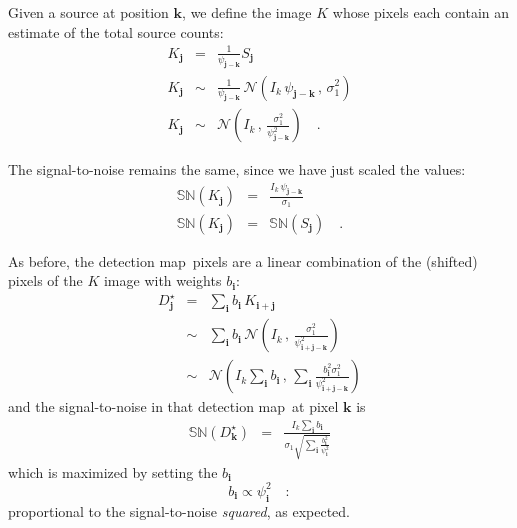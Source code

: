 \documentclass[letterpaper,preprint]{aastex62}
\newcommand{\detmap}{detection map}
\newcommand{\drawnfrom}{\sim}
\newcommand{\gaussianN}{\mathcal{N}}
\newcommand{\gaussian}[1]{\gaussianN\!\left(#1\right)}
\newcommand{\psf}{\psi}
\newcommand{\psfat}[1]{\psf_{#1}}
\newcommand{\snr}[1]{\mathbb{SN}(#1)}
\renewcommand{\vec}[1]{\boldsymbol{#1}}
\newcommand{\ivec}{\vec{i}}
\newcommand{\jvec}{\vec{j}}
\newcommand{\kvec}{\vec{k}}
\begin{document}
Given a source at position $\kvec$, we define the image $K$ whose
pixels each contain an estimate of the total source counts:
\begin{eqnarray}
  K_{\jvec} &=& \frac{1}{\psfat{\jvec-\kvec}} S_{\jvec}  \\
  K_{\jvec} &\drawnfrom& \frac{1}{\psfat{\jvec-\kvec}} \, \gaussian{I_k \, \psfat{\jvec-\kvec}\, , \, \sigma_1^2} \\
  K_{\jvec} &\drawnfrom& \gaussian{I_k \, , \, \frac{\sigma_1^2}{\psfat{\jvec-\kvec}^2}} \quad .
\end{eqnarray}

The signal-to-noise remains the same, since we have just scaled the
values:
\begin{eqnarray}
\snr{K_{\jvec}} &=& \frac{I_k \, \psfat{\jvec-\kvec}}{\sigma_1} \\
\snr{K_{\jvec}} &=& \snr{S_{\jvec}} \quad .
\end{eqnarray}


As before, the \detmap\ pixels are a linear combination of the
(shifted) pixels of the $K$ image with weights $b_{\ivec}$:
\begin{eqnarray}
D_{\jvec}^\star &=& \sum_{\ivec} b_{\ivec} \, K_{\ivec+\jvec} \\
&\drawnfrom& \sum_{\ivec} b_{\ivec} \, \gaussian{I_k \,,\, \frac{\sigma_1^2}{\psfat{\ivec+\jvec-\kvec}^2}} \\
&\drawnfrom& \gaussian{I_k \sum_{\ivec} b_{\ivec} \,,\, \sum_{\ivec} \frac{b_{\ivec}^2 \sigma_1^2}{\psfat{\ivec+\jvec-\kvec}^2}}
\end{eqnarray}
and the signal-to-noise in that \detmap\ at pixel $\kvec$ is
\begin{eqnarray}
\snr{D_{\kvec}^\star} &=& \frac{I_k \sum_{\ivec} b_{\ivec}}{\sigma_1 \sqrt{\sum_{\ivec} \frac{b_{\ivec}^2}{\psfat{\ivec}^2}}}
\end{eqnarray}
which is maximized by setting the $b_{\ivec}$
\begin{equation}
b_{\ivec} \propto \psfat{\ivec}^2 \quad :
\end{equation}
proportional to the signal-to-noise \emph{squared}, as expected.

%
%
%
%
\end{document}
